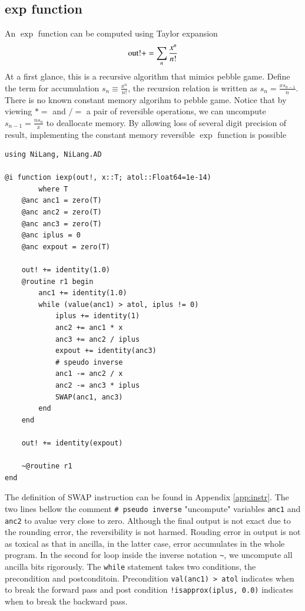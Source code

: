 \documentclass[aps,twocolumn,longbibliography,english,superscriptaddress,prr]{revtex4-1}
\newcommand{\<}{\langle}
\renewcommand{\>}{\rangle}
\newcommand{\App}[1]{Appendix \ref{#1}}
\theoremstyle{definition}\newtheorem{definition}{\textit{Definition}}
\begin{document}
\subsection{exp function}
An $\exp$ function can be computed using Taylor expansion
\begin{equation}
    {\rm out!} += \sum\limits_n \frac{x^n}{n!}
\end{equation}
At a first glance, this is a recursive algorithm that mimics pebble game.
Define the term for accumulation $s_n \equiv \frac{x^n}{n!}$, the recursion relation is written as $s_n = \frac{x s_{n-1}}{n}$.
There is no known constant memory algorihm to pebble game.
Notice that by viewing $*=$ and $/=$ a pair of reversible operations, we can uncompute $s_{n-1} = \frac{n s_n}{x}$ to deallocate memory.
By allowing loss of several digit precision of result, implementing the constant memory reversible $\exp$ function is possible

\begin{minipage}{.44\textwidth}
\begin{lstlisting}
using NiLang, NiLang.AD

@i function iexp(out!, x::T; atol::Float64=1e-14)
        where T
    @anc anc1 = zero(T)
    @anc anc2 = zero(T)
    @anc anc3 = zero(T)
    @anc iplus = 0
    @anc expout = zero(T)

    out! += identity(1.0)
    @routine r1 begin
        anc1 += identity(1.0)
        while (value(anc1) > atol, iplus != 0)
            iplus += identity(1)
            anc2 += anc1 * x
            anc3 += anc2 / iplus
            expout += identity(anc3)
            # speudo inverse
            anc1 -= anc2 / x
            anc2 -= anc3 * iplus
            SWAP(anc1, anc3)
        end
    end

    out! += identity(expout)

    ~@routine r1
end
\end{lstlisting}
\end{minipage}

The definition of SWAP instruction can be found in \App{app:instr}.
The two lines bellow the comment \texttt{\# pseudo inverse} "uncompute" variables \texttt{anc1} and \texttt{anc2} to avalue very close to zero.
Although the final output is not exact due to the rounding error, the reversibility is not harmed.
Rouding error in output is not as toxical as that in ancilla, in the latter case, error accumulates in the whole program.
In the second for loop inside the inverse notation \texttt{\~}, we uncompute all ancilla bits rigorously.
The \texttt{while} statement takes two conditions, the precondition and postconditoin. Precondition \texttt{val(anc1) > atol} indicates when to break the forward pass and post condition \texttt{!isapprox(iplus, 0.0)} indicates when to break the backward pass.
\end{document}
